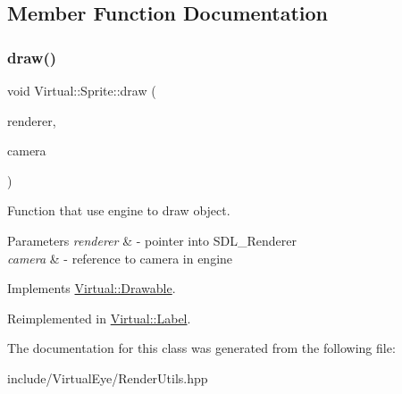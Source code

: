\subsection{Member Function Documentation}
\hypertarget{class_virtual_1_1_sprite_a57f581e0307ab2b2dd7c6922dba2a057}{}\label{class_virtual_1_1_sprite_a57f581e0307ab2b2dd7c6922dba2a057} 
\subsubsection{\texorpdfstring{draw()}{draw()}}
{\footnotesize\ttfamily void Virtual\+::\+Sprite\+::draw (\begin{DoxyParamCaption}\item[{S\+D\+L\+\_\+\+Renderer $\ast$}]{renderer,  }\item[{\hyperlink{class_virtual_1_1_camera}{Camera} \&}]{camera }\end{DoxyParamCaption})\hspace{0.3cm}{\ttfamily [virtual]}}



Function that use engine to draw object. 


\begin{DoxyParams}{Parameters}
{\em renderer} & -\/ pointer into S\+D\+L\+\_\+\+Renderer \\
\hline
{\em camera} & -\/ reference to camera in engine \\
\hline
\end{DoxyParams}


Implements \hyperlink{class_virtual_1_1_drawable_af7014800911efa59b96e538149e56f8b}{Virtual\+::\+Drawable}.



Reimplemented in \hyperlink{class_virtual_1_1_label_a077d7852f09f940a9932f63fb616351c}{Virtual\+::\+Label}.



The documentation for this class was generated from the following file\+:\begin{DoxyCompactItemize}
\item 
include/\+Virtual\+Eye/Render\+Utils.\+hpp\end{DoxyCompactItemize}
